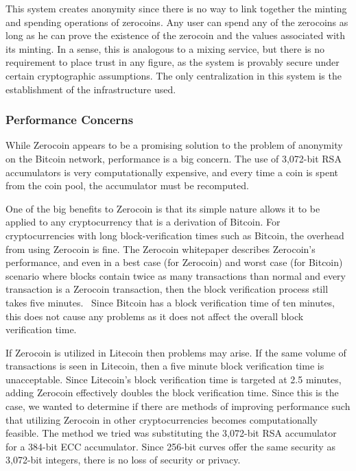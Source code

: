 \documentclass[11pt]{article}
\begin{document}
This system creates anonymity since there is no way to link together the minting and spending operations of zerocoins.
Any user can spend any of the zerocoins as long as he can prove the existence of the zerocoin and the values associated
with its minting. In a sense, this is analogous to a mixing service, but there is no requirement to place trust in any
figure, as the system is provably secure under certain cryptographic assumptions. The only centralization in this system
is the establishment of the infrastructure used.

\subsubsection{Performance Concerns}
While Zerocoin appears to be a promising solution to the problem of anonymity on the Bitcoin network, performance is a
big concern. The use of 3,072-bit RSA accumulators is very computationally expensive, and every time a coin is spent
from the coin pool, the accumulator must be recomputed.

One of the big benefits to Zerocoin is that its simple nature allows it to be applied to any cryptocurrency that is a
derivation of Bitcoin. For cryptocurrencies with long block-verification times such as Bitcoin, the overhead from using
Zerocoin is fine. The Zerocoin whitepaper describes Zerocoin's performance, and even in a best case (for Zerocoin) and
worst case (for Bitcoin) scenario where blocks contain twice as many transactions than normal and every transaction is a
Zerocoin transaction, then the block verification process still takes five minutes.~\cite{miers13} Since Bitcoin has a
block verification time of ten minutes, this does not cause any problems as it does not affect the overall block
verification time.

If Zerocoin is utilized in Litecoin then problems may arise. If the same volume of transactions is seen in Litecoin,
then a five minute block verification time is unacceptable. Since Litecoin's block verification time is targeted at 2.5
minutes, adding Zerocoin effectively doubles the block verification time. Since this is the case, we wanted to determine
if there are methods of improving performance such that utilizing Zerocoin in other cryptocurrencies becomes
computationally feasible. The method we tried was substituting the 3,072-bit RSA accumulator for a 384-bit ECC
accumulator. Since 256-bit curves offer the same security as 3,072-bit integers, there is no loss of security or
privacy.\cite{nistcase}
\end{document}
